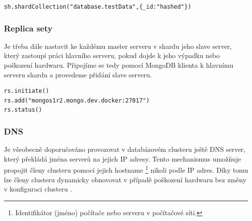 \begin{lstlisting}[caption={Nastavení MongoDB shardingu pro kolekci testData v databázi database podle indexu \_id typu hashed}]
sh.shardCollection("database.testData",{_id:"hashed"})
\end{lstlisting}
\subsubsection{Replica sety}
Je třeba dále nastavit ke každému master serveru v shardu jeho slave server, který zastoupí práci hlavního serveru, pokud dojde k jeho výpadku nebo poškození hardwaru. Připojíme se tedy pomocí MongoDB klienta k hlavnímu serveru shardu a provedeme přidání slave serveru.
\begin{lstlisting}[caption={Konfigurace MongoDB replica setu na Master serveru}]
rs.initiate()
rs.add("mongos1r2.mongo.dev.docker:27017")
rs.status()
\end{lstlisting}

\subsubsection{DNS}
Je všeobecně doporučováno provozovat v databázovém clusteru ještě DNS server, který překládá jména serverů na jejich IP adresy. Tento mechanismus umožňuje propojit členy clusteru pomocí jejich hostname \footnote{Identifikátor (jméno) počítače nebo serveru v počítačové síti.} nikoli podle IP adres. Díky tomu lze členy clusteru dynamicky obnovovat v případě poškození hardwaru bez změny v konfiguraci clusteru \cite{mongoCluster}.

